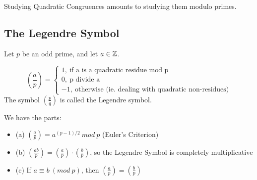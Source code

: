 \begin{remark}
Studying Quadratic Congruences amounts to studying them modulo primes.
\end{remark}

\subsection{The Legendre Symbol}
Let $p$ be an odd prime, and let $a \in \mathbb{Z}$.
\begin{definition}
\[(\frac{a}{p}) = \begin{cases}
1,\ \text{if a is a quadratic residue mod p}\\
0,\ \text{p divide a}\\
-1,\ \text{otherwise (ie. dealing with quadratic non-residues)}
\end{cases}\]
The symbol $(\frac{p}{q})$ is called the Legendre symbol.
\end{definition}

\begin{proposition}[5.1.2]
We have the parts:
\begin{itemize}
    \item (a) $(\frac{a}{p}) = a^{(p-1)/2}\ mod\ p$ (Euler's Criterion)
    \item (b) $(\frac{ab}{p}) = (\frac{a}{p}) \cdot (\frac{b}{p})$, so the Legendre Symbol is completely multiplicative
    \item (c) If $a \equiv b\ (mod\ p)$, then $(\frac{a}{p}) = (\frac{b}{p})$
\end{itemize}
\end{proposition}